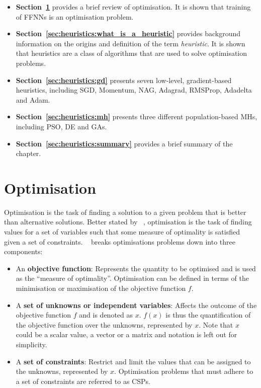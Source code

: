 \begin{itemize}
	\item \textbf{Section~\ref{sec:heuristics:optimisation}} provides a brief review of optimisation. It is shown that training of \acp{FFNN} is an optimisation problem.

	\item \textbf{Section~\ref{sec:heuristics:what_is_a_heuristic}} provides background information on the origins and definition of the term \textit{heuristic}. It is shown that heuristics are a class of algorithms that are used to solve optimisation problems.

	\item \textbf{Section~\ref{sec:heuristics:gd}} presents seven low-level, gradient-based heuristics, including \acf{SGD}, \acf{Momentum}, \acf{NAG}, \acf{Adagrad}, \acf{RMSProp}, \acf{Adadelta} and \acf{Adam}.

	\item \textbf{Section~\ref{sec:heuristics:mh}} presents three different population-based \acp{MH}, including \acf{PSO}, \acf{DE} and \acfp{GA}.

	\item \textbf{Section~\ref{sec:heuristics:summary}} provides a brief summary of the chapter.
\end{itemize}

\section{Optimisation}\label{sec:heuristics:optimisation}

Optimisation is the task of finding a solution to a given problem that is better than alternative solutions. Better stated by \citeauthor{ref:oldewage:2017}~\cite{ref:oldewage:2017}, optimisation is the task of finding values for a set of variables such that some measure of optimality is satisfied given a set of constraints. \citeauthor{ref:engelbrecht:2007}~\cite{ref:engelbrecht:2007} breaks optimisations problems down into three components:

\begin{itemize}
	\item An \textbf{objective function}: Represents the quantity to be optimised and is used as the ``measure of optimality''. Optimisation can be defined in terms of the minimisation or maximisation of the objective function $f$.

	\item A \textbf{set of unknowns or independent variables}: Affects the outcome of the objective function $f$ and is denoted as $x$. $f(x)$ is thus the quantification of the objective function over the unknowns, represented by $x$. Note that $x$ could be a scalar value, a vector or a matrix and notation is left out for simplicity.

	\item A \textbf{set of constraints}: Restrict and limit the values that can be assigned to the unknowns, represented by $x$. Optimisation problems that must adhere to a set of constraints are referred to as \acfp{CSP}.
\end{itemize}

